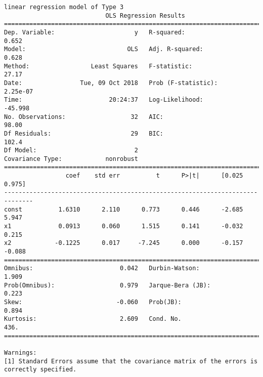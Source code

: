 \documentclass[11pt]{article}
\begin{document}
    \begin{Verbatim}[commandchars=\\\{\}]
linear regression model of Type 3
                            OLS Regression Results                            
==============================================================================
Dep. Variable:                      y   R-squared:                       0.652
Model:                            OLS   Adj. R-squared:                  0.628
Method:                 Least Squares   F-statistic:                     27.17
Date:                Tue, 09 Oct 2018   Prob (F-statistic):           2.25e-07
Time:                        20:24:37   Log-Likelihood:                -45.998
No. Observations:                  32   AIC:                             98.00
Df Residuals:                      29   BIC:                             102.4
Df Model:                           2                                         
Covariance Type:            nonrobust                                         
==============================================================================
                 coef    std err          t      P>|t|      [0.025      0.975]
------------------------------------------------------------------------------
const          1.6310      2.110      0.773      0.446      -2.685       5.947
x1             0.0913      0.060      1.515      0.141      -0.032       0.215
x2            -0.1225      0.017     -7.245      0.000      -0.157      -0.088
==============================================================================
Omnibus:                        0.042   Durbin-Watson:                   1.909
Prob(Omnibus):                  0.979   Jarque-Bera (JB):                0.223
Skew:                          -0.060   Prob(JB):                        0.894
Kurtosis:                       2.609   Cond. No.                         436.
==============================================================================

Warnings:
[1] Standard Errors assume that the covariance matrix of the errors is correctly specified.

    \end{Verbatim}
\end{document}
